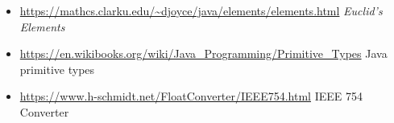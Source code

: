 \documentclass[11pt]{article}%
\begin{document}
\begin{multicols}{2}
\begin{itemize}
\item \url{https://mathcs.clarku.edu/~djoyce/java/elements/elements.html} \textit{Euclid's Elements}

\item \url{https://en.wikibooks.org/wiki/Java_Programming/Primitive_Types} Java primitive types

\item \url{https://www.h-schmidt.net/FloatConverter/IEEE754.html} IEEE 754 Converter



\end{itemize}

\end{multicols}

\printbibliography

\printindex %
\end{document}
